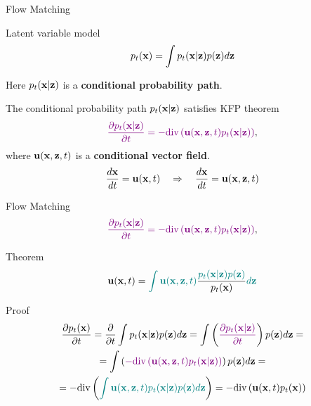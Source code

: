 \begin{frame}{Flow Matching}
	\begin{block}{Latent variable model}
		\[
			p_t(\mathbf{x}) = \int p_t(\mathbf{x} | \mathbf{z}) p(\mathbf{z}) d \mathbf{z} 
		\]
	\end{block}
	Here $p_t(\mathbf{x} | \mathbf{z})$ is a \textbf{conditional probability path}.
	
	The conditional probability path $p_t(\mathbf{x} | \mathbf{z})$ satisfies KFP theorem
	\[
		{\color{violet}\frac{\partial p_t(\mathbf{x} | \mathbf{z})}{\partial t} = - \text{div}\left(\mathbf{u}(\mathbf{x}, \mathbf{z}, t) p_t(\mathbf{x} | \mathbf{z})\right)},
	\]
	where $\mathbf{u}(\mathbf{x}, \mathbf{z}, t)$ is a \textbf{conditional vector field}.
	\[
		\frac{d\mathbf{x}}{dt} = \mathbf{u}(\mathbf{x}, t) \quad \Rightarrow \quad \frac{d\mathbf{x}}{dt} = \mathbf{u}(\mathbf{x}, \mathbf{z}, t)
	\]
	\vspace{-0.3cm}
\end{frame}
\begin{frame}{Flow Matching}
	\[
		{\color{violet}\frac{\partial p_t(\mathbf{x} | \mathbf{z})}{\partial t} = - \text{div}\left(\mathbf{u}(\mathbf{x}, \mathbf{z}, t) p_t(\mathbf{x} | \mathbf{z})\right)},
	\]
	\begin{block}{Theorem}
		\vspace{-0.3cm}
		\[
			\mathbf{u}(\mathbf{x}, t) = {\color{teal}\int \mathbf{u}(\mathbf{x}, \mathbf{z}, t)} \frac{\color{teal}p_t(\mathbf{x} | \mathbf{z}) p(\mathbf{z})}{p_t(\mathbf{x})} {\color{teal}d \mathbf{z}}
		\]
		\vspace{-0.4cm}
	\end{block}
	\begin{block}{Proof}
		\vspace{-0.5cm}
		\begin{multline*}
			\frac{\partial p_t(\mathbf{x})}{\partial t} = \frac{\partial}{\partial t} \int p_t(\mathbf{x} | \mathbf{z}) p(\mathbf{z}) d \mathbf{z} =  \int \left( {\color{violet} \frac{\partial p_t(\mathbf{x} | \mathbf{z})}{\partial t} } \right) p(\mathbf{z}) d \mathbf{z} = \\
			= \int \left( {\color{violet} - \text{div}\left(\mathbf{u}(\mathbf{x}, \mathbf{z}, t) p_t(\mathbf{x} | \mathbf{z})\right) } \right) p(\mathbf{z}) d \mathbf{z} = \\
			= - \text{div} \left({\color{teal}\int \mathbf{u}(\mathbf{x}, \mathbf{z}, t) p_t(\mathbf{x} | \mathbf{z}) p(\mathbf{z}) d \mathbf{z} }\right) = - \text{div}  \left(\mathbf{u}(\mathbf{x}, t) p_t(\mathbf{x})\right)
		\end{multline*}
	\end{block}
\end{frame}
